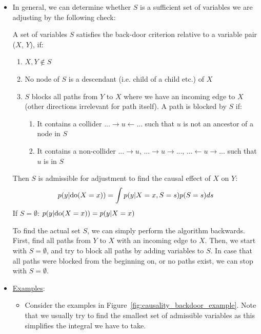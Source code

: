 \begin{itemize}
	\item In general, we can determine whether $S$ is a sufficient set of variables we are adjusting by the following check:
	
	\begin{tcolorbox}[colback=white!80!gray,colframe=gray!75!black,title=Back-door criterion]
		A set of variables $S$ satisfies the back-door criterion relative to a variable pair ($X$, $Y$), if:
		\begin{enumerate}
			\item $X, Y\not\in S$
			\item No node of $S$ is a descendant (i.e. child of a child etc.) of $X$
			\item $S$ blocks all paths from $Y$ to $X$ where we have an incoming edge to $X$ (other directions irrelevant for path itself). A path is blocked by $S$ if:
			\begin{enumerate}
				\item It contains a collider $...\rightarrow u \leftarrow ...$ such that $u$ is not an ancestor of a node in $S$
				\item It contains a non-collider $...\rightarrow u$, $...\rightarrow u \rightarrow ...$, $...\leftarrow u \rightarrow ...$ such that $u$ is in $S$
			\end{enumerate}
		\end{enumerate}
		Then $S$ is admissible for adjustment to find the causal effect of $X$ on $Y$:
		$$p(y|\textnormal{do}(X=x))=\int p(y|X=x,S=s)p(S=s)ds$$
		If $S=\emptyset$: $p(y|\textnormal{do}(X=x))=p(y|X=x)$
	\end{tcolorbox}	

	To find the actual set $S$, we can simply perform the algorithm backwards. First, find all paths from $Y$ to $X$ with an incoming edge to $X$. Then, we start with $S=\emptyset$, and try to block all paths by adding variables to $S$. In case that all paths were blocked from the beginning on, or no paths exist, we can stop with $S=\emptyset$.
	
	\item \underline{Examples}: 
	\begin{itemize}
		\item Consider the examples in Figure~\ref{fig:causality_backdoor_example}. Note that we usually try to find the smallest set of admissible variables as this simplifies the integral we have to take.
		

\end{itemize}
\end{itemize}
